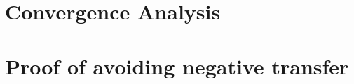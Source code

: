 \section{Convergence Analysis}\label{appd:convg}


\section{Proof of avoiding negative transfer}\label{appd:proof}


%

